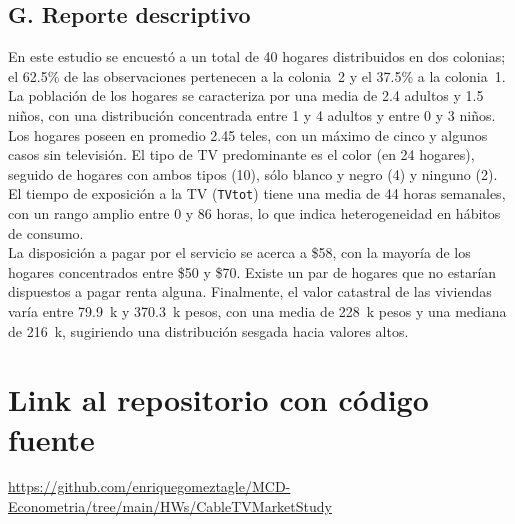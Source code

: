 \documentclass[10pt]{article}
\begin{document}
\subsection*{G. Reporte descriptivo}
En este estudio se encuestó a un total de 40 hogares distribuidos en dos colonias; el 62.5\% de las observaciones pertenecen a la colonia~2 y el 37.5\% a la colonia~1. La población de los hogares se caracteriza por una media de 2.4 adultos y 1.5 niños, con una distribución concentrada entre 1 y 4 adultos y entre 0 y 3 niños.\\
Los hogares poseen en promedio 2.45 teles, con un máximo de cinco y algunos casos sin televisión. El tipo de TV predominante es el color (en 24 hogares), seguido de hogares con ambos tipos (10), sólo blanco y negro (4) y ninguno (2). El tiempo de exposición a la TV (\texttt{TVtot}) tiene una media de 44 horas semanales, con un rango amplio entre 0 y 86 horas, lo que indica heterogeneidad en hábitos de consumo.\\
La disposición a pagar por el servicio se acerca a \$58, con la mayoría de los hogares concentrados entre \$50 y \$70. Existe un par de hogares que no estarían dispuestos a pagar renta alguna. Finalmente, el valor catastral de las viviendas varía entre 79.9~k y 370.3~k pesos, con una media de 228~k pesos y una mediana de 216~k, sugiriendo una distribución sesgada hacia valores altos.

\section{Link al repositorio con código fuente}
\href{https://github.com/enriquegomeztagle/MCD-Econometria/tree/main/HWs/CableTVMarketStudy}{https://github.com/enriquegomeztagle/MCD-Econometria/tree/main/HWs/CableTVMarketStudy}
\end{document}
